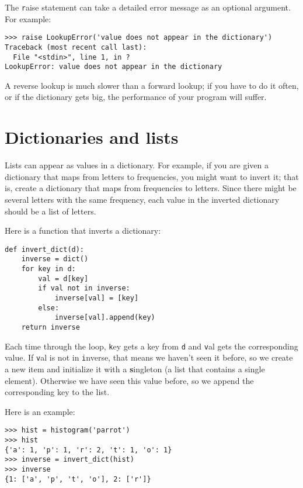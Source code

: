\documentclass[
DIV=11,
fontsize=12,
twoside,
headinclude=false,
titlepage=firstiscover,
abstract=true,
headsepline=true,
footsepline=true,
chapterprefix=true, %
headings=big,
bibliography=totoc,%
captions=tableheading
]{scrbook}
\theoremstyle{definition}
\begin{document}
The {\texttt raise} statement can take a detailed error message as an
optional argument.  For example:

\begin{lstlisting}
>>> raise LookupError('value does not appear in the dictionary')
Traceback (most recent call last):
  File "<stdin>", line 1, in ?
LookupError: value does not appear in the dictionary
\end{lstlisting}
%
A reverse lookup is much slower than a forward lookup; if you
have to do it often, or if the dictionary gets big, the performance
of your program will suffer.


\section{Dictionaries and lists}
\label{invert}

Lists can appear as values in a dictionary.  For example, if you
are given a dictionary that maps from letters to frequencies, you
might want to invert it; that is, create a dictionary that maps
from frequencies to letters.  Since there might be several letters
with the same frequency, each value in the inverted dictionary
should be a list of letters.

Here is a function that inverts a dictionary:

\begin{lstlisting}
def invert_dict(d):
    inverse = dict()
    for key in d:
        val = d[key]
        if val not in inverse:
            inverse[val] = [key]
        else:
            inverse[val].append(key)
    return inverse
\end{lstlisting}
%
Each time through the loop, {\texttt key} gets a key from {\texttt d} and 
{\texttt val} gets the corresponding value.  If {\texttt val} is not in {\texttt
  inverse}, that means we haven't seen it before, so we create a new
item and initialize it with a {\textbf singleton} (a list that contains a
single element).  Otherwise we have seen this value before, so we
append the corresponding key to the list.  

Here is an example:

\begin{lstlisting}
>>> hist = histogram('parrot')
>>> hist
{'a': 1, 'p': 1, 'r': 2, 't': 1, 'o': 1}
>>> inverse = invert_dict(hist)
>>> inverse
{1: ['a', 'p', 't', 'o'], 2: ['r']}
\end{lstlisting}
\end{document}
